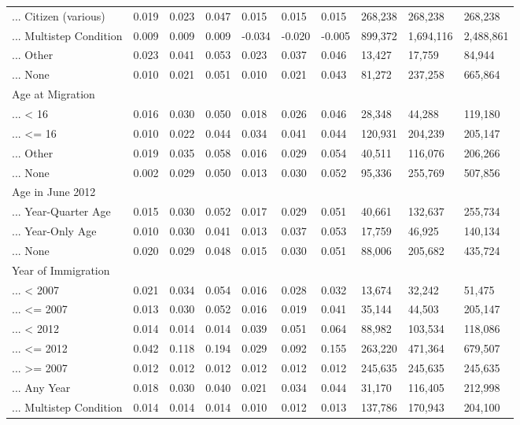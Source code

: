 \documentclass[
  letterpaper,
  DIV=11,
  numbers=noendperiod]{scrartcl}
\begin{document}
\begin{table}[!htbp]
{\begin{tabular}{llllllllll}
... Citizen (various) & 0.019 & 0.023 & 0.047 & 0.015 & 0.015 & 0.015 & 268,238 & 268,238 & 268,238 \\ 
... Multistep Condition & 0.009 & 0.009 & 0.009 & -0.034 & -0.020 & -0.005 & 899,372 & 1,694,116 & 2,488,861 \\ 
... Other & 0.023 & 0.041 & 0.053 & 0.023 & 0.037 & 0.046 & 13,427 & 17,759 & 84,944 \\ 
... None & 0.010 & 0.021 & 0.051 & 0.010 & 0.021 & 0.043 & 81,272 & 237,258 & 665,864 \\ 
Age at Migration &  &  &  &  &  &  &  &  &  \\ 
... < 16 & 0.016 & 0.030 & 0.050 & 0.018 & 0.026 & 0.046 & 28,348 & 44,288 & 119,180 \\ 
... <= 16 & 0.010 & 0.022 & 0.044 & 0.034 & 0.041 & 0.044 & 120,931 & 204,239 & 205,147 \\ 
... Other & 0.019 & 0.035 & 0.058 & 0.016 & 0.029 & 0.054 & 40,511 & 116,076 & 206,266 \\ 
... None & 0.002 & 0.029 & 0.050 & 0.013 & 0.030 & 0.052 & 95,336 & 255,769 & 507,856 \\ 
Age in June 2012 &  &  &  &  &  &  &  &  &  \\ 
... Year-Quarter Age & 0.015 & 0.030 & 0.052 & 0.017 & 0.029 & 0.051 & 40,661 & 132,637 & 255,734 \\ 
... Year-Only Age & 0.010 & 0.030 & 0.041 & 0.013 & 0.037 & 0.053 & 17,759 & 46,925 & 140,134 \\ 
... None & 0.020 & 0.029 & 0.048 & 0.015 & 0.030 & 0.051 & 88,006 & 205,682 & 435,724 \\ 
Year of Immigration &  &  &  &  &  &  &  &  &  \\ 
... < 2007 & 0.021 & 0.034 & 0.054 & 0.016 & 0.028 & 0.032 & 13,674 & 32,242 & 51,475 \\ 
... <= 2007 & 0.013 & 0.030 & 0.052 & 0.016 & 0.019 & 0.041 & 35,144 & 44,503 & 205,147 \\ 
... < 2012 & 0.014 & 0.014 & 0.014 & 0.039 & 0.051 & 0.064 & 88,982 & 103,534 & 118,086 \\ 
... <= 2012 & 0.042 & 0.118 & 0.194 & 0.029 & 0.092 & 0.155 & 263,220 & 471,364 & 679,507 \\ 
... >= 2007 & 0.012 & 0.012 & 0.012 & 0.012 & 0.012 & 0.012 & 245,635 & 245,635 & 245,635 \\ 
... Any Year & 0.018 & 0.030 & 0.040 & 0.021 & 0.034 & 0.044 & 31,170 & 116,405 & 212,998 \\ 
... Multistep Condition & 0.014 & 0.014 & 0.014 & 0.010 & 0.012 & 0.013 & 137,786 & 170,943 & 204,100 \\ 

\end{tabular}}
\end{table}
\end{document}
